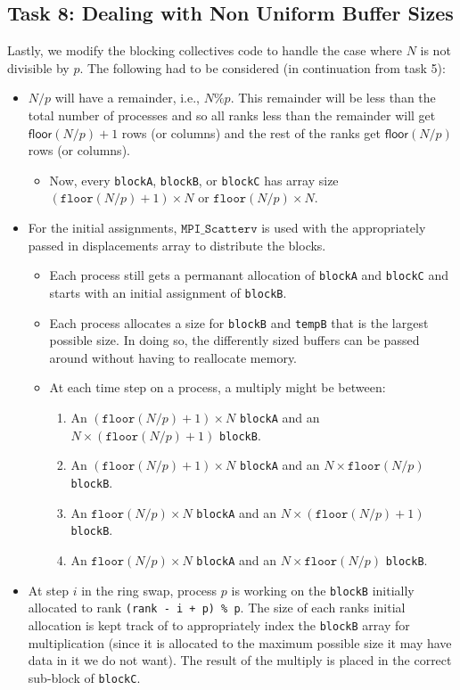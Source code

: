 \documentclass{article}
\begin{document}
\subsection*{Task 8: Dealing with Non Uniform Buffer Sizes}
Lastly, we modify the blocking collectives code to handle the case where $N$ 
is not divisible by $p$. The following had to be considered (in continuation from task 5):
\newpage
\begin{itemize}
    \item $N/p$ will have a remainder, i.e., $N \% p$. This remainder 
    will be less than the total number of processes and so all ranks less than 
    the remainder will get $\mathsf{floor}(N/p) + 1$ rows (or columns) and the 
    rest of the ranks get $\mathsf{floor}(N/p)$ rows (or columns).
    \begin{itemize}
        \item Now, every \texttt{blockA}, \texttt{blockB}, or \texttt{blockC} has 
        array size $(\texttt{floor}(N/p) + 1) \times N$ or $\texttt{floor}(N/p) \times N$. 
    \end{itemize}
    \item For the initial assignments, $\texttt{MPI\_Scatterv}$ is used with the appropriately passed 
    in displacements array to distribute the blocks.
    \begin{itemize}
        \item Each process still gets a permanant allocation of \texttt{blockA} and \texttt{blockC} and 
        starts with an initial assignment of \texttt{blockB}.
        \item Each process allocates a size for \texttt{blockB} and \texttt{tempB} that is the largest possible size.
        In doing so, the differently sized buffers can be passed around without having to reallocate memory.
        \item At each time step on a process, a multiply might be between:
        \begin{enumerate}
            \item An $(\texttt{floor}(N/p) + 1) \times N$ \texttt{blockA} and an $N \times (\texttt{floor}(N/p) + 1)$ \texttt{blockB}.
            \item An $(\texttt{floor}(N/p) + 1) \times N$ \texttt{blockA} and an $N \times \texttt{floor}(N/p)$ \texttt{blockB}.
            \item An $\texttt{floor}(N/p) \times N$ \texttt{blockA} and an $N \times (\texttt{floor}(N/p) + 1)$ \texttt{blockB}.
            \item An $\texttt{floor}(N/p) \times N$ \texttt{blockA} and an $N \times \texttt{floor}(N/p)$ \texttt{blockB}.
        \end{enumerate}
    \end{itemize}
    \item At step $i$ in the ring swap, process $p$ is working on the \texttt{blockB} initially allocated to rank \texttt{(rank - i + p) \% p}.
    The size of each ranks initial allocation is kept track of to appropriately index the \texttt{blockB} array for multiplication 
    (since it is allocated to the maximum possible size it may have data in it we do not want). The result of the multiply is placed in the correct sub-block of \texttt{blockC}.


\end{itemize}
\end{document}
